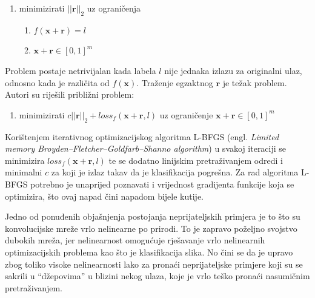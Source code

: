 \documentclass[utf8, diplomski]{fer}
\begin{document}
\begin{enumerate}[noitemsep, label=\textbullet]\label{original_formulation}
  \item minimizirati $||\boldsymbol{r}||_{2}$ uz ograničenja
  \begin{enumerate}
  \item $f(\boldsymbol{x}+\boldsymbol{r}) = l$
  \item $\boldsymbol{x} + \boldsymbol{r} \in [0, 1]^{m}$
  \end{enumerate}
\end{enumerate}
Problem postaje netrivijalan kada labela $l$ nije jednaka izlazu za originalni ulaz, odnosno kada je različita od $f(\boldsymbol{x})$. Traženje egzaktnog $\boldsymbol{r}$ je težak problem. Autori su riješili približni problem:
\begin{enumerate}[noitemsep, label=\textbullet]
  \item minimizirati $c||\boldsymbol{r}||_{2} + loss_{f}(\boldsymbol{x} + \boldsymbol{r}, l)$ uz ograničenje $\boldsymbol{x} + \boldsymbol{r} \in [0, 1]^{m}$
\end{enumerate}
Korištenjem iterativnog optimizacijskog algoritma L-BFGS (engl. \textit{Limited memory Broyden–Fletcher–Goldfarb–Shanno algorithm}) u svakoj iteraciji se minimizira $loss_{f}(\boldsymbol{x} + \boldsymbol{r}, l)$ te se dodatno linijskim pretraživanjem odredi i minimalni $c$ za koji je izlaz takav da je klasifikacija pogrešna. Za rad algoritma L-BFGS potrebno je unaprijed poznavati i vrijednost gradijenta funkcije koja se optimizira, što ovaj napad čini napadom bijele kutije. \par
Jedno od ponuđenih objašnjenja postojanja neprijateljskih primjera je to što su konvolucijske mreže vrlo nelinearne po prirodi. To je zapravo poželjno svojstvo dubokih mreža, jer nelinearnost omogućuje rješavanje vrlo nelinearnih optimizacijskih problema kao što je klasifikacija slika. No čini se da je upravo zbog toliko visoke nelinearnosti lako za pronaći neprijateljske primjere koji su se sakrili u ``džepovima'' u blizini nekog ulaza, koje je vrlo teško pronaći nasumičnim pretraživanjem. 
\end{document}
